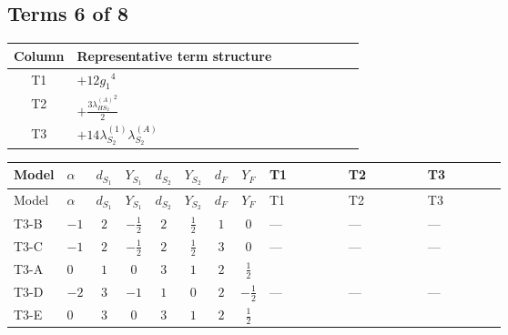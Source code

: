 \documentclass[8pt]{article}
\begin{document}
\begin{landscape}
\subsection*{Terms 6 of 8}
\begin{center}
\begin{tabular}{@{}c >{\raggedright\arraybackslash}p{0.82\linewidth}@{}}
\toprule
Column & Representative term structure \\
\midrule
T1 & \(\displaystyle +12 {g_1}^4\) \\
\midrule
T2 & \(\displaystyle +\frac{3 {\lambda_{HS_2}^{(A)}}^2}{2}\) \\
\midrule
T3 & \(\displaystyle +14 {\lambda_{S_2}^{(1)}} {\lambda_{S_2}^{(A)}}\) \\
\midrule
\bottomrule
\end{tabular}
\end{center}
\smallskip
\tiny
\begin{longtable}{@{}llcccccc >{\raggedright\arraybackslash}p{0.21\linewidth} >{\raggedright\arraybackslash}p{0.21\linewidth} >{\raggedright\arraybackslash}p{0.21\linewidth}@{}}
\toprule
Model & $\alpha$ & $d_{S_1}$ & $Y_{S_1}$ & $d_{S_2}$ & $Y_{S_2}$ & $d_F$ & $Y_F$ & T1 & T2 & T3 \\
\midrule
\endfirsthead
\toprule
Model & $\alpha$ & $d_{S_1}$ & $Y_{S_1}$ & $d_{S_2}$ & $Y_{S_2}$ & $d_F$ & $Y_F$ & T1 & T2 & T3 \\
\midrule
\endhead
T3-B & $-1$ & $2$ & $-\frac{1}{2}$ & $2$ & $\frac{1}{2}$ & $1$ & $0$ & --- & --- & --- \\
\midrule
T3-C & $-1$ & $2$ & $-\frac{1}{2}$ & $2$ & $\frac{1}{2}$ & $3$ & $0$ & --- & --- & --- \\
\midrule
T3-A & $0$ & $1$ & $0$ & $3$ & $1$ & $2$ & $\frac{1}{2}$ & \scriptsize\adjustbox{max width=\linewidth}{$\begin{gathered} +12 {g_1}^4\end{gathered}$} & \scriptsize\adjustbox{max width=\linewidth}{$\begin{gathered} +\frac{3 {\lambda_{HS_2}^{(A)}}^2}{2}\end{gathered}$} & \scriptsize\adjustbox{max width=\linewidth}{$\begin{gathered} +14 {\lambda_{S_2}^{(1)}} {\lambda_{S_2}^{(A)}}\end{gathered}$} \\
\midrule
T3-D & $-2$ & $3$ & $-1$ & $1$ & $0$ & $2$ & $-\frac{1}{2}$ & --- & --- & --- \\
\midrule
T3-E & $0$ & $3$ & $0$ & $3$ & $1$ & $2$ & $\frac{1}{2}$ & \scriptsize\adjustbox{max width=\linewidth}{$\begin{gathered} +12 {g_1}^4\end{gathered}$} & \scriptsize\adjustbox{max width=\linewidth}{$\begin{gathered} +\frac{3 {\lambda_{HS_2}^{(A)}}^2}{2}\end{gathered}$} & \scriptsize\adjustbox{max width=\linewidth}{$\begin{gathered} +14 {\lambda_{S_2}^{(1)}} {\lambda_{S_2}^{(A)}}\end{gathered}$} \\

\end{longtable}
\end{landscape}
\end{document}
